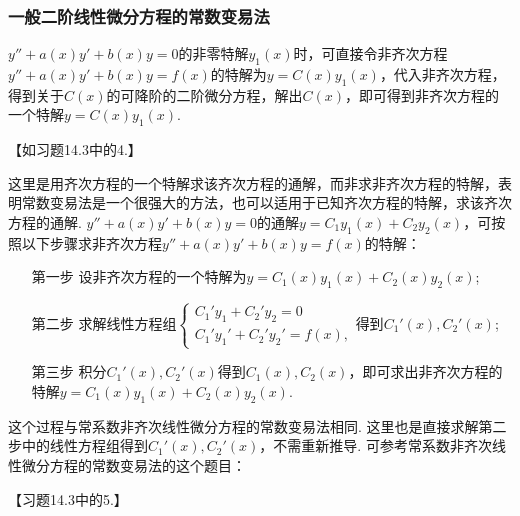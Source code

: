 \documentclass[12pt,UTF8,fleqn]{ctexart}
\begin{document}
\subsubsection{一般二阶线性微分方程的常数变易法}
\begin{enumerate}
$y''+a(x)y'+b(x)y=0$的非零特解$y_1(x)$时，可直接令非齐次方程$y''+a(x)y'+b(x)y=f(x)$的特解为$y=C(x)y_1(x)$，代入非齐次方程，得到关于$C(x)$的可降阶的二阶微分方程，解出$C(x)$，即可得到非齐次方程的一个特解$y=C(x)y_1(x)$.

【如习题14.3中的4.】

这里是用齐次方程的一个特解求该齐次方程的通解，而非求非齐次方程的特解，表明常数变易法是一个很强大的方法，也可以适用于已知齐次方程的特解，求该齐次方程的通解.
$y''+a(x)y'+b(x)y=0$的通解$y=C_1y_1(x)+C_2y_2(x)$，可按照以下步骤求非齐次方程$y''+a(x)y'+b(x)y=f(x)$的特解：
\begin{enumerate}
\item[第一步]设非齐次方程的一个特解为$y=C_1(x)y_1(x)+C_2(x)y_2(x)$;
\item[第二步]求解线性方程组$\begin{cases}C_1'y_1+C_2'y_2=0\\ C_1'y_1'+C_2'y_2'=f(x),\end{cases}$得到$C_1'(x),C_2'(x)$;
\item[第三步]积分$C_1'(x),C_2'(x)$得到$C_1(x),C_2(x)$，即可求出非齐次方程的特解$y=C_1(x)y_1(x)+C_2(x)y_2(x)$.
\end{enumerate}
这个过程与常系数非齐次线性微分方程的常数变易法相同. 这里也是直接求解第二步中的线性方程组得到$C_1'(x),C_2'(x)$，不需重新推导. 可参考常系数非齐次线性微分方程的常数变易法的这个题目：

【习题14.3中的5.】
\end{enumerate}
\end{document}
